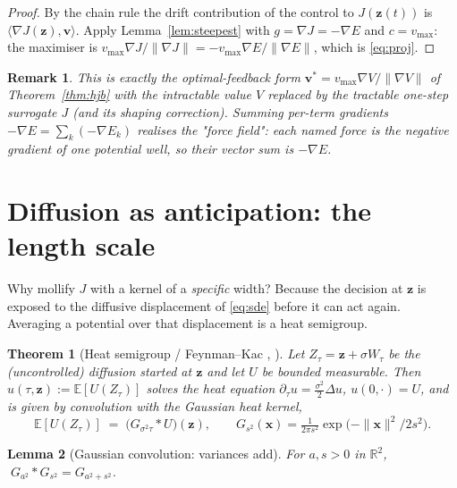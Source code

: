 \documentclass[11pt]{article}
\newtheorem{theorem}{Theorem}[section]
\newtheorem{lemma}[theorem]{Lemma}
\newtheorem*{remark}{Remark}
\newcommand{\R}{\mathbb{R}}
\newcommand{\E}{\mathbb{E}}
\newcommand{\vmax}{v_{\max}}
\newcommand{\z}{\mathbf{z}}
\newcommand{\vv}{\mathbf{v}}
\newcommand{\x}{\mathbf{x}}
\begin{document}
\begin{proof}
By the chain rule the drift contribution of the control to $J(\z(t))$ is
$\langle\nabla J(\z),\vv\rangle$. Apply Lemma~\ref{lem:steepest} with
$g=\nabla J=-\nabla E$ and $c=\vmax$: the maximiser is
$\vmax\nabla J/\|\nabla J\|=-\vmax\nabla E/\|\nabla E\|$, which is \eqref{eq:proj}.
\end{proof}

\begin{remark}
This is exactly the optimal-feedback form $\vv^\ast=\vmax\nabla V/\|\nabla V\|$ of
Theorem~\ref{thm:hjb} with the intractable value $V$ replaced by the tractable
one-step surrogate $J$ (and its shaping correction). Summing per-term gradients
$-\nabla E=\sum_k(-\nabla E_k)$ realises the "force field": each named force is
the negative gradient of one potential well, so their vector sum \emph{is}
$-\nabla E$.
\end{remark}

\newpage
\section{Diffusion as anticipation: the length scale}\label{sec:anticipation}

Why mollify $J$ with a kernel of a \emph{specific} width? Because the decision at
$\z$ is exposed to the diffusive displacement of \eqref{eq:sde} before it can
act again. Averaging a potential over that displacement is a heat semigroup.

\begin{theorem}[Heat semigroup / Feynman--Kac {\cite[Ch.~4--5]{KaratzasShreve}, \cite[Ch.~2]{Evans}}]
\label{thm:heat}
Let $Z_\tau=\z+\sigma W_\tau$ be the (uncontrolled) diffusion started at $\z$ and
let $U$ be bounded measurable. Then $u(\tau,\z):=\E[U(Z_\tau)]$ solves the heat
equation $\partial_\tau u=\tfrac{\sigma^2}{2}\Delta u$, $u(0,\cdot)=U$, and is
given by convolution with the Gaussian heat kernel,
\[
  \E[U(Z_\tau)]\;=\;\big(G_{\sigma^2\tau}\ast U\big)(\z),
  \qquad G_{s^2}(\x)=\tfrac{1}{2\pi s^2}\exp\!\big(-\|\x\|^2/2s^2\big).
\]
\end{theorem}

\begin{lemma}[Gaussian convolution: variances add]\label{lem:gauss}
For $a,s>0$ in $\R^2$, $\;G_{a^2}\ast G_{s^2}=G_{a^2+s^2}$.
\end{lemma}
\end{document}
